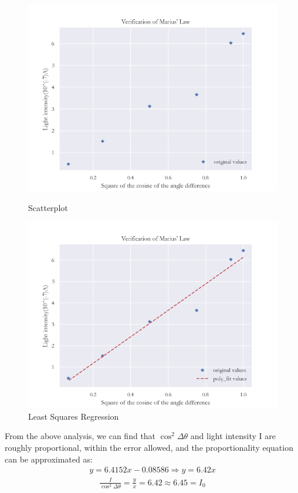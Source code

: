 \documentclass[UTF8]{article}
\begin{document}
	\begin{figure}[H]
		\begin{minipage}[t]{0.5\linewidth}
			\centering
			\includegraphics[clip,scale=0.5]{figure/fig14.png}
			\caption{Scatterplot}
			\label{figure.13}
		\end{minipage}
		\begin{minipage}[t]{0.5\linewidth}
			\centering
			\includegraphics[clip,scale=0.5,trim={0 0 0 0}]{figure/fig15.png}
			\caption{Least Squares Regression}
			\label{figure.14}
		\end{minipage}
	\end{figure}

From the above analysis, we can find that $\cos ^{2}\Delta \theta   $ and light intensity I are roughly proportional, within the error allowed, and the proportionality equation can be approximated as:
\begin{eqnarray}y=  6.4152x -0.08586 \Rightarrow y =6.42x \end{eqnarray}
\begin{eqnarray}\frac{I}{\cos ^{2}\Delta \theta  } =\frac{y}{x}=6.42\approx 6.45 = I_{0} \end{eqnarray}
\end{document}
